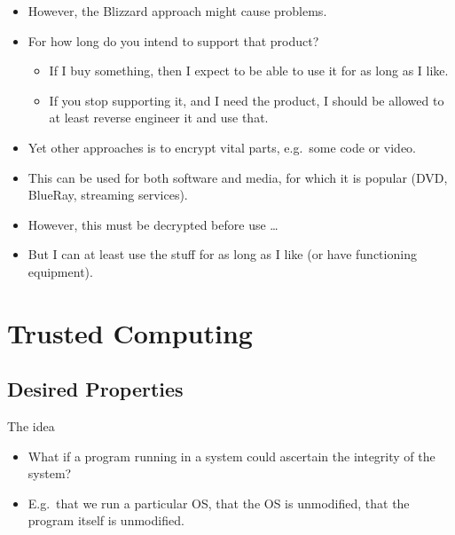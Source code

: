 \begin{frame}
  \begin{itemize}
    \item However, the Blizzard approach might cause problems.
    \item For how long do you intend to support that product?
      \begin{itemize}
        \item If I buy something, then I expect to be able to use it for as 
          long as I like.
        \item If you stop supporting it, and I need the product, I should be 
          allowed to at least reverse engineer it and use that.
      \end{itemize}
  \end{itemize}
\end{frame}

\begin{frame}
  \begin{itemize}
    \item Yet other approaches is to encrypt vital parts, e.g.\ some code or 
      video.

    \item This can be used for both software and media, for which it is popular 
      (DVD, BlueRay, streaming services).

    \item However, this must be decrypted before use \dots

    \item But I can at least use the stuff for as long as I like (or have 
      functioning equipment).
  \end{itemize}
\end{frame}


\section{Trusted Computing}

\subsection{Desired Properties}

\begin{frame}
  \begin{block}{The idea}
    \begin{itemize}
      \item What if a program running in a system could ascertain the integrity 
        of the system?

      \item E.g.\ that we run a particular OS, that the OS is unmodified, that 
        the program itself is unmodified.

    \end{itemize}
  \end{block}
\end{frame}

